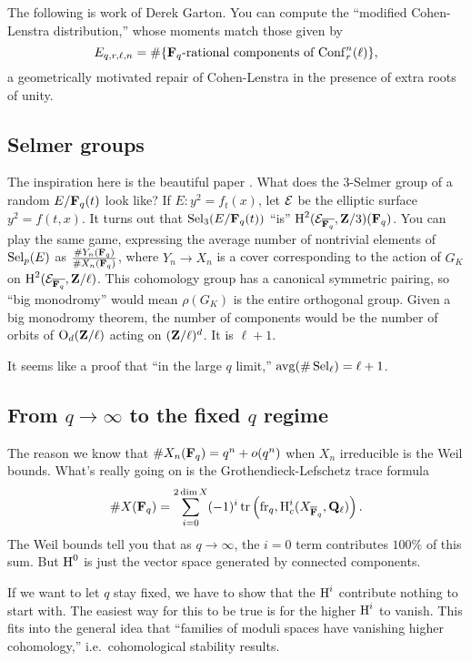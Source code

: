 The following is work of Derek Garton. You can compute the ``modified 
Cohen-Lenstra distribution,'' whose moments match those given by 
\[
  E_{q,r,\ell,n} = \#\{\text{$\mathbf{F}_q$-rational components of $\operatorname{Conf}_r^n(\ell)$}\} ,
\]
a geometrically motivated repair of Cohen-Lenstra in the presence of extra 
roots of unity. 





\subsection{Selmer groups}

The inspiration here is the beautiful paper \cite{j02}. What does the 3-Selmer 
group of a random $E/\mathbf{F}_q(t)$ look like? If $E:y^2=f_t(x)$, let $\mathcal{E}$ be the 
elliptic surface $y^2=f(t,x)$. It turns out that 
$\operatorname{Sel}_3(E/\mathbf{F}_q(t))$ ``is'' $\operatorname{H}^2(\mathcal{E}_{\overline{\mathbf{F}_q}},\mathbf{Z}/3)(\mathbf{F}_q)$. You 
can play the same game, expressing the average number of nontrivial elements of 
$\operatorname{Sel}_p(E)$ as $\frac{\#Y_n(\mathbf{F}_q)}{\#X_n(\mathbf{F}_q)}$, where $Y_n\to X_n$ is a 
cover corresponding to the action of $G_K$ on 
$\operatorname{H}^2(\mathcal{E}_{\overline{\mathbf{F}_q}},\mathbf{Z}/\ell)$. This cohomology group has a canonical 
symmetric pairing, so ``big monodromy'' would mean $\rho(G_K)$ is the entire 
orthogonal group. Given a big monodromy theorem, the number of components would 
be the number of orbits of $\operatorname{O}_d(\mathbf{Z}/\ell)$ acting on 
$(\mathbf{Z}/\ell)^d$. It is $\ell+1$. 

It seems like a proof that ``in the large $q$ limit,'' 
$\operatorname{avg}(\#\operatorname{Sel}_\ell)=\ell+1$. 





\subsection{From \texorpdfstring{$q\to \infty$}{q to infty} to the fixed \texorpdfstring{$q$}{q} regime}

The reason we know that $\# X_n(\mathbf{F}_q)=q^n+o(q^n)$ when $X_n$ irreducible is 
the Weil bounds. What's really going on is the Grothendieck-Lefschetz trace 
formula 
\[
  \# X(\mathbf{F}_q) = \sum_{i=0}^{2\dim X} (-1)^i \operatorname{tr}\left(\operatorname{fr}_q,\operatorname{H}_c^i(X_{\overline{\mathbf{F}}_q},\mathbf{Q}_\ell)\right) .
\]
The Weil bounds tell you that as $q\to \infty$, the $i=0$ term contributes 
$100\%$ of this sum. But $\operatorname{H}^0$ is just the vector space generated by connected 
components. 

If we want to let $q$ stay fixed, we have to show that the $\operatorname{H}^i$ contribute 
nothing to start with. The easiest way for this to be true is for the higher 
$\operatorname{H}^i$ to vanish. This fits into the general idea that ``families of moduli 
spaces have vanishing higher cohomology,'' i.e.~cohomological stability 
results. 




